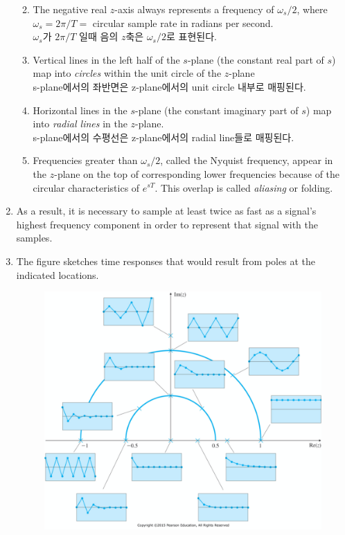 \begin{enumerate}
\begin{enumerate}
			\newpage
			\item The negative real $z$-axis always represents a frequency of $\omega_s/2$, where $\omega_s = 2\pi/T = $ circular sample rate in radians per second.\\
			 $\omega_s$가  $2\pi/T$ 일때 음의 $z$축은 $\omega_s/2$로 표현된다.
			\item Vertical lines in the left half of the $s$-plane (the constant real part of $s$) map into \emph{circles} within the unit circle of the $z$-plane \\
			s-plane에서의 좌반면은 z-plane에서의 unit circle 내부로 매핑된다.
			\item Horizontal lines in the $s$-plane (the constant imaginary part of $s$) map into \emph{radial lines} in the $z$-plane. \\
			s-plane에서의 수평선은 z-plane에서의 radial line들로 매핑된다.
			\item Frequencies greater than $\omega_s/2$, called the Nyquist frequency, appear in the $z$-plane on the top of corresponding lower frequencies because of the circular characteristics of $e^{sT}$. This overlap is called \emph{aliasing} or folding.  
		\end{enumerate} 
		\item As a result, it is necessary to sample at least twice as fast as a signal's highest frequency component in order to represent that signal with the samples. 
		\item The figure sketches time responses that would result from poles at the indicated locations.
		\begin{figure}[h]
			\includegraphics[width=14cm]{./FIG_Franklin/fig8-5.png}
		\end{figure}
	\end{enumerate}